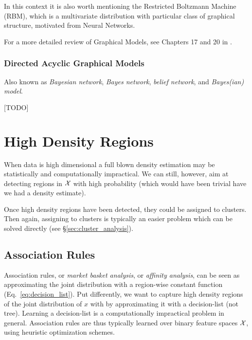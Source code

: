 \begin{remark}
In this context it is also worth mentioning the Restricted Boltzmann Machine (RBM), which is a multivariate distribution with particular class of graphical structure, motivated from Neural Networks. 
\end{remark}


For a more detailed review of Graphical Models, see Chapters 17 and 20 in \cite{wasserman_all_2004}. 



\subsubsection{Directed Acyclic Graphical Models}
Also known as \emph{Bayesian network}, \emph{Bayes network}, \emph{belief network}, and \emph{Bayes(ian) model}.

[TODO]




\section{High Density Regions}
\label{sec:high_density}

When data is high dimensional a full blown density estimation may be statistically and computationally impractical.
We can still, however, aim at detecting regions in $\mathcal{X}$ with high probability (which would have been trivial have we had a density estimate).

Once high density regions have been detected, they could be assigned to clusters. Then again, assigning to clusters is typically an easier problem which can be solved directly (see \S\ref{sec:cluster_analysis}).



\subsection{Association Rules}
\label{sec:association}
Association rules, or \emph{market basket analysis}, or \emph{affinity analysis}, can be seen as approximating the joint distribution with a region-wise constant function (Eq.~\ref{eq:decision_list}).
Put differently, we want to capture high density regions of the joint distribution of $x$ with by approximating it with a decision-list (not tree).
Learning a decision-list is a computationally impractical problem in general. Association rules are thus typically learned over binary feature spaces $\mathcal{X}$, using heuristic optimization schemes.

